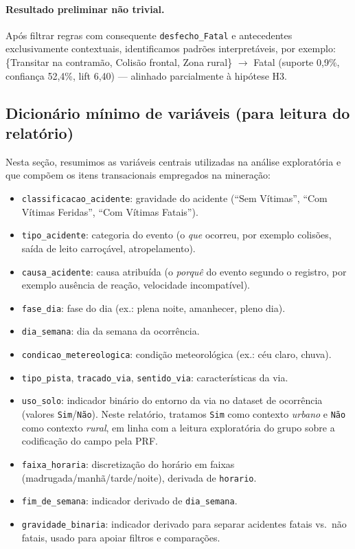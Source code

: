 \documentclass[12pt]{article}
\begin{document}
\paragraph{Resultado preliminar não trivial.}
Após filtrar regras com consequente \texttt{desfecho\_Fatal} e antecedentes exclusivamente contextuais, identificamos padrões interpretáveis, por exemplo: \{Transitar na contramão, Colisão frontal, Zona rural\} $\rightarrow$ Fatal (suporte 0,9\%, confiança 52,4\%, lift 6,40) --- alinhado parcialmente à hipótese H3.

\subsection{Dicionário mínimo de variáveis (para leitura do relatório)}

Nesta seção, resumimos as variáveis centrais utilizadas na análise exploratória e que compõem os itens transacionais empregados na mineração:
\begin{itemize}[leftmargin=*]
    \item \texttt{classificacao\_acidente}: gravidade do acidente (``Sem Vítimas'', ``Com Vítimas Feridas'', ``Com Vítimas Fatais'').
    \item \texttt{tipo\_acidente}: categoria do evento (o \textit{que} ocorreu, por exemplo colisões, saída de leito carroçável, atropelamento).
    \item \texttt{causa\_acidente}: causa atribuída (o \textit{porquê} do evento segundo o registro, por exemplo ausência de reação, velocidade incompatível).
    \item \texttt{fase\_dia}: fase do dia (ex.: plena noite, amanhecer, pleno dia).
    \item \texttt{dia\_semana}: dia da semana da ocorrência.
    \item \texttt{condicao\_metereologica}: condição meteorológica (ex.: céu claro, chuva).
    \item \texttt{tipo\_pista}, \texttt{tracado\_via}, \texttt{sentido\_via}: características da via.
    \item \texttt{uso\_solo}: indicador binário do entorno da via no dataset de ocorrência (valores \texttt{Sim}/\texttt{Não}). Neste relatório, tratamos \texttt{Sim} como contexto \textit{urbano} e \texttt{Não} como contexto \textit{rural}, em linha com a leitura exploratória do grupo sobre a codificação do campo pela PRF.
    \item \texttt{faixa\_horaria}: discretização do horário em faixas (madrugada/manhã/tarde/noite), derivada de \texttt{horario}.
    \item \texttt{fim\_de\_semana}: indicador derivado de \texttt{dia\_semana}.
    \item \texttt{gravidade\_binaria}: indicador derivado para separar acidentes fatais vs.\ não fatais, usado para apoiar filtros e comparações.
\end{itemize}
\end{document}
